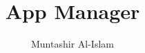 \documentclass{memoir}
\title{App Manager}
\author{Muntashir Al-Islam}
\begin{document}
    
    \ifdefined\HCode
    \else
        \tableofcontents
    \fi
    
    
    
    
    
\end{document}
